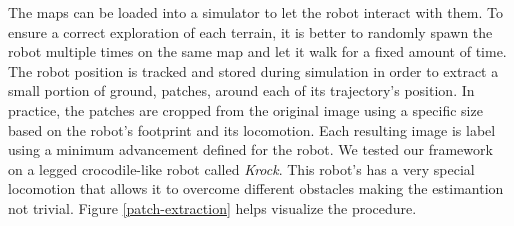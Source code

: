 \documentclass[../document.tex]{subfiles}
\begin{document}
The maps can be loaded into a simulator to let the robot interact with them. To ensure a correct exploration of each terrain, it is better to randomly spawn the robot multiple times on the same map and let it walk for a fixed amount of time. The robot position is tracked and stored during simulation in order to extract a small portion of ground, patches, around each of its trajectory's position. In practice, the patches are cropped from the original image using a specific size based on the robot's footprint and its locomotion. Each resulting image is label using a minimum advancement defined for the robot. We tested our framework on a legged crocodile-like robot called \emph{Krock}. This robot's has a very special locomotion that allows it to overcome different obstacles making the estimantion not trivial.  Figure \ref{patch-extraction} helps visualize the procedure.
\end{document}
